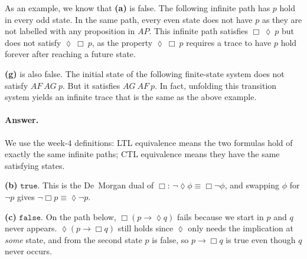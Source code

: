 \documentclass{article}
\newcommand{\true}{\texttt{true}}
\newcommand{\false}{\texttt{false}}
\renewcommand{\diamond}{\lozenge} %
\begin{document}
As an example, we know that \textbf{(a)} is false. The following infinite path has $p$ hold in every odd state. In the same path, every even state does not have $p$ as they are not labelled with any proposition in $AP$. This infinite path satisfies $\Box\ \diamond\ p$ but does not satisfy $\diamond\ \Box\ p$, as the property $\diamond\ \Box\ p$ requires a trace to have $p$ hold forever after reaching a future state.

\bigskip



\bigskip

\textbf{(g)} is also false. The initial state of the following finite-state system does not satisfy $AF\ AG\ p$. But it satisfies $AG\ AF\ p$. In fact, unfolding this transition system yields an infinite trace that is the same as the above example.

\bigskip


\paragraph{Answer.}
We use the week-4 definitions: LTL equivalence means the two formulas hold of exactly the same infinite paths; CTL equivalence means they have the same satisfying states.

\medskip
\textbf{(b)} $\true$. This is the De~Morgan dual of $\Box$: $\neg\diamond\phi\equiv\Box\neg\phi$, and swapping $\phi$ for $\neg p$ gives $\neg\Box p\equiv\diamond\neg p$.

\medskip
\textbf{(c)} $\false$. On the path below, $\Box(p\rightarrow\diamond q)$ fails because we start in $p$ and $q$ never appears. $\diamond(p\rightarrow\Box q)$ still holds since $\diamond$ only needs the implication at \emph{some} state, and from the second state $p$ is false, so $p\rightarrow\Box q$ is true even though $q$ never occurs.
\end{document}

